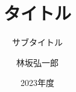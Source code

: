 \documentclass[12pt,dvipdfmx,aspectratio=169]{beamer}
\title{タイトル}
\subtitle{サブタイトル}
\author{林坂弘一郎}
\date{2023年度}
\institute[神戸学院大学]{神戸学院大学 経営学部}
\theoremstyle{example}
\begin{document}
\frame{\titlepage}
\section[Outline]{}
\frame{\tableofcontents}

\end{document}
